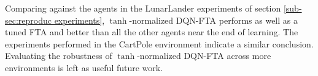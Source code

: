 \documentclass{article}
\begin{document}
Comparing against the agents in the LunarLander experiments of section \ref{sub-sec:reproduc experiments}, $\tanh$-normalized DQN-FTA performs as well as a tuned FTA and better than all the other agents near the end of learning.
The experiments performed in the CartPole environment indicate a similar conclusion. 
Evaluating the robustness of $\tanh$-normalized DQN-FTA across more environments is left as useful future work.


\newpage

\end{document}
